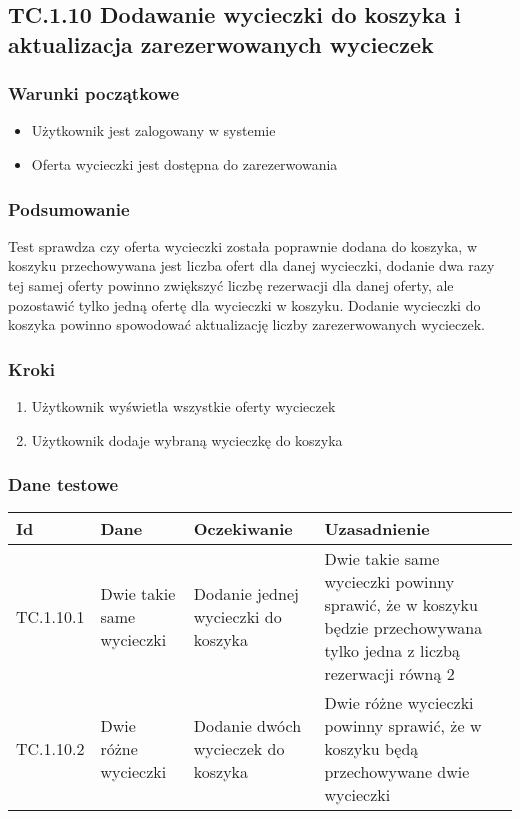 \documentclass[a4paper,15pt]{article}
\begin{document}
\newpage
\begin{framed}
\subsection{TC.1.10 Dodawanie wycieczki do koszyka i aktualizacja zarezerwowanych wycieczek}


\vspace{0.5cm}

\subsubsection{Warunki początkowe}
\begin{itemize}
\item Użytkownik jest zalogowany w systemie
\item Oferta wycieczki jest dostępna do zarezerwowania
\end{itemize}

\subsubsection{Podsumowanie}
Test sprawdza czy oferta wycieczki została poprawnie dodana do koszyka, w koszyku przechowywana jest liczba ofert dla danej wycieczki, dodanie dwa razy tej samej oferty powinno zwiększyć liczbę rezerwacji dla danej oferty, ale pozostawić tylko jedną ofertę dla wycieczki w koszyku. Dodanie wycieczki do koszyka powinno spowodować aktualizację liczby zarezerwowanych wycieczek.

\subsubsection{Kroki}
\begin{enumerate}
\item Użytkownik wyświetla wszystkie oferty wycieczek
\item Użytkownik dodaje wybraną wycieczkę do koszyka
\end{enumerate}

\subsubsection{Dane testowe}

\begin{center}
\begin{tabular}{ |C{1.5cm}|C{3cm}|C{4cm}|C{4cm}| } 
 \hline
 \textbf{Id} & \textbf{Dane} & \textbf{Oczekiwanie} & \textbf{Uzasadnienie} \\ \hline
 TC.1.10.1 & Dwie takie same wycieczki & Dodanie jednej wycieczki do koszyka & Dwie takie same wycieczki powinny sprawić, że w koszyku będzie przechowywana tylko jedna z liczbą rezerwacji równą 2 \\ \hline
  TC.1.10.2 & Dwie różne wycieczki & Dodanie dwóch wycieczek do koszyka & Dwie różne wycieczki powinny sprawić, że w koszyku będą przechowywane dwie wycieczki \\ \hline
\end{tabular}
\end{center}

\end{framed}
\end{document}
